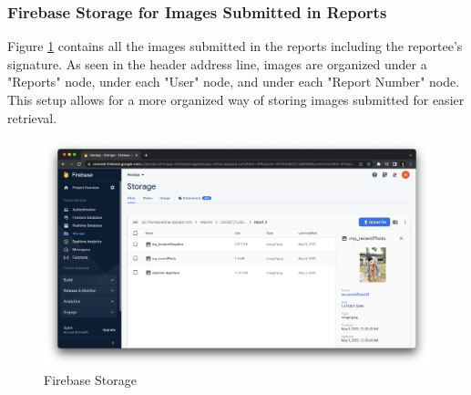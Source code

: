\subsubsection{Firebase Storage for Images Submitted in Reports}

Figure \ref{fig:firebaseStorage} contains all the images submitted in the reports including the reportee's signature. As seen in the header address line, images are organized under a "Reports" node, under each "User" node, and under each "Report Number" node. This setup allows for a more organized way of storing images submitted for easier retrieval.
\begin{figure}[!h]
    \centering
    \begin{minipage}[c]{1\linewidth}
        \centering
        \includegraphics[scale=0.25]{figures/Chapter4/Firebase/storage.png}
        \caption{Firebase Storage}
        \label{fig:firebaseStorage}
    \end{minipage}
\end{figure}